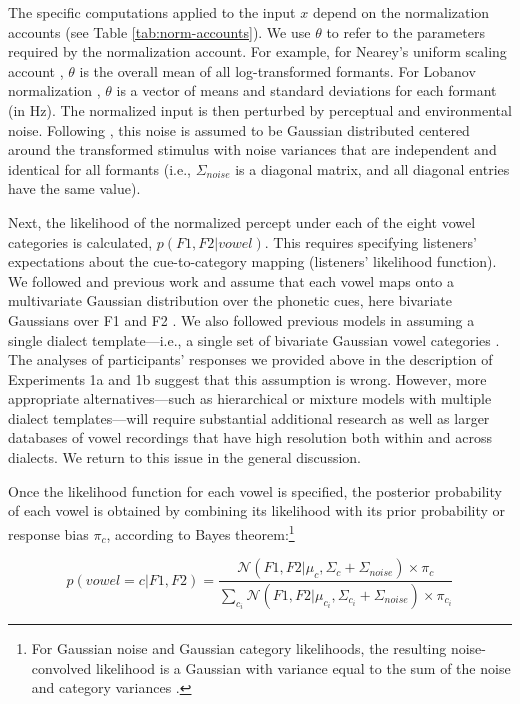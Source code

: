 \documentclass[preprint]{JASA}
\begin{document}
The specific computations applied to the input \(x\) depend on the normalization accounts (see Table \ref{tab:norm-accounts}). We use \(\theta\) to refer to the parameters required by the normalization account. For example, for Nearey's uniform scaling account \citep{nearey1978}, \(\theta\) is the overall mean of all log-transformed formants. For Lobanov normalization \citep{lobanov1971}, \(\theta\) is a vector of means and standard deviations for each formant (in Hz). The normalized input is then perturbed by perceptual and environmental noise. Following \citet{feldman2009}, this noise is assumed to be Gaussian distributed centered around the transformed stimulus with noise variances that are independent and identical for all formants (i.e., \(\Sigma_{noise}\) is a diagonal matrix, and all diagonal entries have the same value).

Next, the likelihood of the normalized percept under each of the eight vowel categories is calculated, \(p(F1, F2 | vowel)\). This requires specifying listeners' expectations about the cue-to-category mapping (listeners' likelihood function). We followed \citet{xie2023} and previous work and assume that each vowel maps onto a multivariate Gaussian distribution over the phonetic cues, here bivariate Gaussians over F1 and F2 \citep[cf.][]{clayards2008, feldman2009, kleinschmidt-jaeger2015, norris-mcqueen2008, xie2021}. We also followed previous models in assuming a single dialect template---i.e., a single set of bivariate Gaussian vowel categories \citep{nearey-assmann2007}. The analyses of participants' responses we provided above in the description of Experiments 1a and 1b suggest that this assumption is wrong. However, more appropriate alternatives---such as hierarchical or mixture models with multiple dialect templates---will require substantial additional research as well as larger databases of vowel recordings that have high resolution both within and across dialects. We return to this issue in the general discussion.

Once the likelihood function for each vowel is specified, the posterior probability of each vowel is obtained by combining its likelihood with its prior probability or response bias \(\pi_c\), according to Bayes theorem:\footnote{For Gaussian noise and Gaussian category likelihoods, the resulting noise-convolved likelihood is a Gaussian with variance equal to the sum of the noise and category variances \citep{kronrod2016}.}

\begin{equation}
 p(vowel = c |F1, F2) = \frac{\mathcal{N}(F1, F2| \mu_c, \Sigma_c + \Sigma_{noise}) \times \pi_c}{\sum_{c_i} \mathcal{N}(F1, F2|\mu_{c_i}, \Sigma_{c_i} + \Sigma_{noise}) \times \pi_{c_i}} \label{eq:Bayes-rule-normal}
\end{equation}
\end{document}
